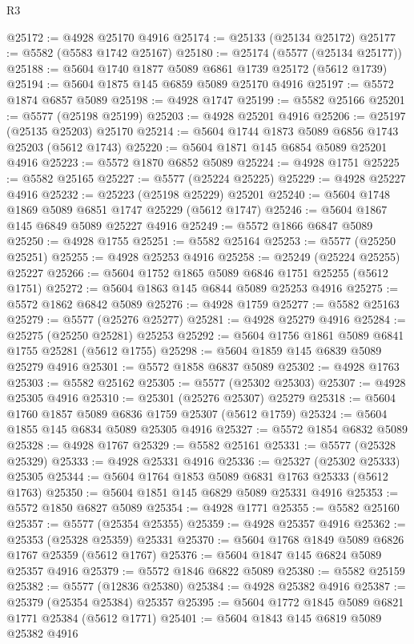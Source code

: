 \begin{lexlean}{R3}
\begin{coremodule}
@25172 := @4928 @25170 @4916
@25174 := @25133 (@25134 @25172)
@25177 := @5582 (@5583 @1742 @25167)
@25180 := @25174 (@5577 (@25134 @25177))
@25188 := @5604 @1740 @1877 @5089 @6861 @1739 @25172 (@5612 @1739)
@25194 := @5604 @1875 @145 @6859 @5089 @25170 @4916
@25197 := @5572 @1874 @6857 @5089
@25198 := @4928 @1747
@25199 := @5582 @25166
@25201 := @5577 (@25198 @25199)
@25203 := @4928 @25201 @4916
@25206 := @25197 (@25135 @25203) @25170
@25214 := @5604 @1744 @1873 @5089 @6856 @1743 @25203 (@5612 @1743)
@25220 := @5604 @1871 @145 @6854 @5089 @25201 @4916
@25223 := @5572 @1870 @6852 @5089
@25224 := @4928 @1751
@25225 := @5582 @25165
@25227 := @5577 (@25224 @25225)
@25229 := @4928 @25227 @4916
@25232 := @25223 (@25198 @25229) @25201
@25240 := @5604 @1748 @1869 @5089 @6851 @1747 @25229 (@5612 @1747)
@25246 := @5604 @1867 @145 @6849 @5089 @25227 @4916
@25249 := @5572 @1866 @6847 @5089
@25250 := @4928 @1755
@25251 := @5582 @25164
@25253 := @5577 (@25250 @25251)
@25255 := @4928 @25253 @4916
@25258 := @25249 (@25224 @25255) @25227
@25266 := @5604 @1752 @1865 @5089 @6846 @1751 @25255 (@5612 @1751)
@25272 := @5604 @1863 @145 @6844 @5089 @25253 @4916
@25275 := @5572 @1862 @6842 @5089
@25276 := @4928 @1759
@25277 := @5582 @25163
@25279 := @5577 (@25276 @25277)
@25281 := @4928 @25279 @4916
@25284 := @25275 (@25250 @25281) @25253
@25292 := @5604 @1756 @1861 @5089 @6841 @1755 @25281 (@5612 @1755)
@25298 := @5604 @1859 @145 @6839 @5089 @25279 @4916
@25301 := @5572 @1858 @6837 @5089
@25302 := @4928 @1763
@25303 := @5582 @25162
@25305 := @5577 (@25302 @25303)
@25307 := @4928 @25305 @4916
@25310 := @25301 (@25276 @25307) @25279
@25318 := @5604 @1760 @1857 @5089 @6836 @1759 @25307 (@5612 @1759)
@25324 := @5604 @1855 @145 @6834 @5089 @25305 @4916
@25327 := @5572 @1854 @6832 @5089
@25328 := @4928 @1767
@25329 := @5582 @25161
@25331 := @5577 (@25328 @25329)
@25333 := @4928 @25331 @4916
@25336 := @25327 (@25302 @25333) @25305
@25344 := @5604 @1764 @1853 @5089 @6831 @1763 @25333 (@5612 @1763)
@25350 := @5604 @1851 @145 @6829 @5089 @25331 @4916
@25353 := @5572 @1850 @6827 @5089
@25354 := @4928 @1771
@25355 := @5582 @25160
@25357 := @5577 (@25354 @25355)
@25359 := @4928 @25357 @4916
@25362 := @25353 (@25328 @25359) @25331
@25370 := @5604 @1768 @1849 @5089 @6826 @1767 @25359 (@5612 @1767)
@25376 := @5604 @1847 @145 @6824 @5089 @25357 @4916
@25379 := @5572 @1846 @6822 @5089
@25380 := @5582 @25159
@25382 := @5577 (@12836 @25380)
@25384 := @4928 @25382 @4916
@25387 := @25379 (@25354 @25384) @25357
@25395 := @5604 @1772 @1845 @5089 @6821 @1771 @25384 (@5612 @1771)
@25401 := @5604 @1843 @145 @6819 @5089 @25382 @4916

\end{coremodule}
\end{lexlean}
